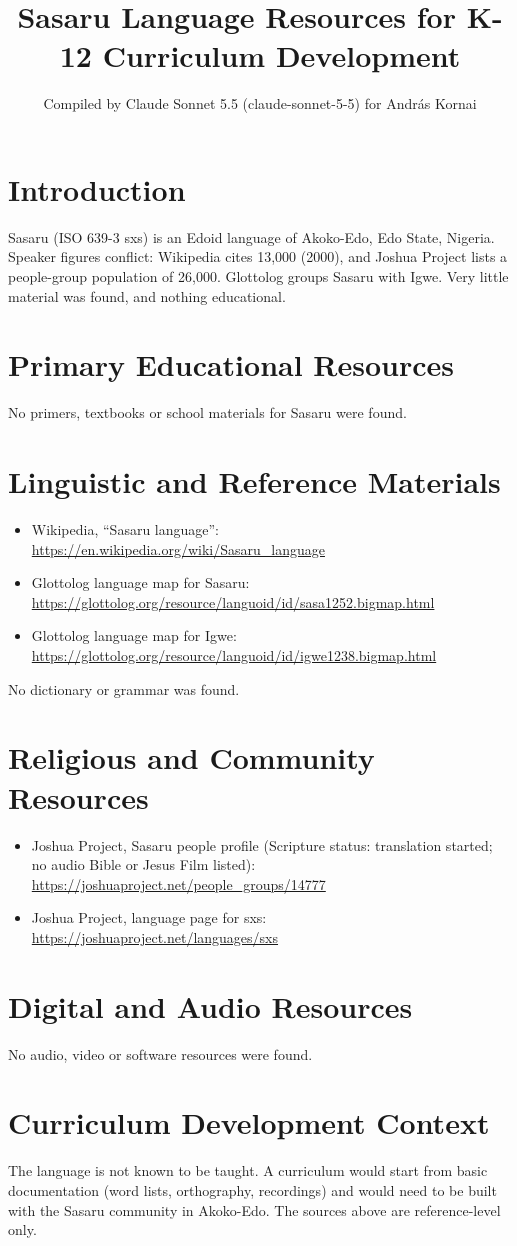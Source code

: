 \documentclass[12pt]{article}
\title{Sasaru Language Resources for K-12 Curriculum Development}
\author{Compiled by Claude Sonnet 5.5 (claude-sonnet-5-5) for Andr\'as Kornai}
\date{}
\begin{document}
\maketitle

\section{Introduction}
Sasaru (ISO 639-3 sxs) is an Edoid language of Akoko-Edo, Edo State, Nigeria. Speaker figures conflict: Wikipedia cites 13,000 (2000), and Joshua Project lists a people-group population of 26,000. Glottolog groups Sasaru with Igwe. Very little material was found, and nothing educational.

\section{Primary Educational Resources}
No primers, textbooks or school materials for Sasaru were found.

\section{Linguistic and Reference Materials}
\begin{itemize}
\item Wikipedia, ``Sasaru language'': \url{https://en.wikipedia.org/wiki/Sasaru_language}
\item Glottolog language map for Sasaru: \url{https://glottolog.org/resource/languoid/id/sasa1252.bigmap.html}
\item Glottolog language map for Igwe: \url{https://glottolog.org/resource/languoid/id/igwe1238.bigmap.html}
\end{itemize}
No dictionary or grammar was found.

\section{Religious and Community Resources}
\begin{itemize}
\item Joshua Project, Sasaru people profile (Scripture status: translation started; no audio Bible or Jesus Film listed): \url{https://joshuaproject.net/people_groups/14777}
\item Joshua Project, language page for sxs: \url{https://joshuaproject.net/languages/sxs}
\end{itemize}

\section{Digital and Audio Resources}
No audio, video or software resources were found.

\section{Curriculum Development Context}
The language is not known to be taught. A curriculum would start from basic documentation (word lists, orthography, recordings) and would need to be built with the Sasaru community in Akoko-Edo. The sources above are reference-level only.
\end{document}

